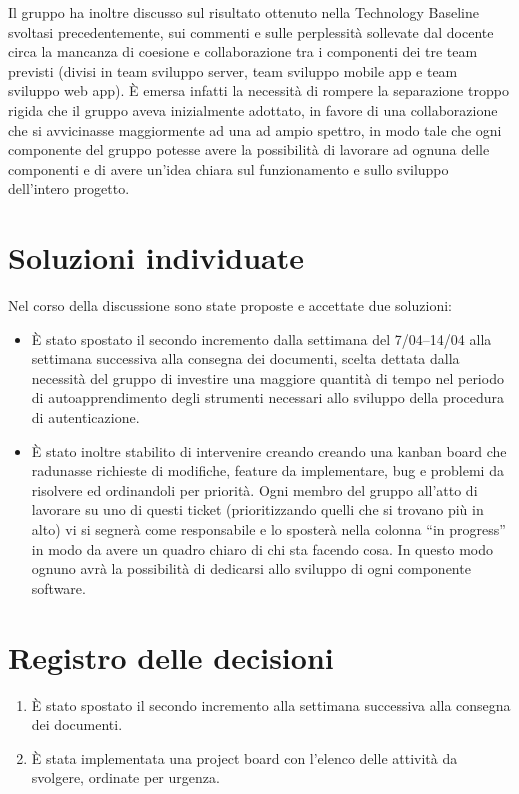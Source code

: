 \documentclass{article}
\begin{document}
Il gruppo ha inoltre discusso sul risultato ottenuto nella Technology Baseline svoltasi precedentemente, sui commenti e sulle perplessità sollevate dal docente circa la mancanza di coesione e collaborazione tra i componenti dei tre team previsti (divisi in team sviluppo server, team sviluppo mobile app e team sviluppo web app).
È emersa infatti la necessità di rompere la separazione troppo rigida che il gruppo aveva inizialmente adottato, in favore di una collaborazione che si avvicinasse maggiormente ad una ad ampio spettro, in modo tale che ogni componente del gruppo potesse avere la possibilità di lavorare ad ognuna delle componenti e di avere un'idea chiara sul funzionamento e sullo sviluppo dell'intero progetto.

\section{Soluzioni individuate}%
\label{sec:soluzioni_individuate}

Nel corso della discussione sono state proposte e accettate due soluzioni:
\begin{itemize}
  \item È stato spostato il secondo incremento dalla settimana del 7/04--14/04 alla settimana successiva alla consegna dei documenti, scelta dettata dalla necessità del gruppo di investire una maggiore quantità di tempo nel periodo di autoapprendimento degli strumenti necessari allo sviluppo della procedura di autenticazione.
  \item È stato inoltre stabilito di intervenire creando creando una kanban board che radunasse richieste di modifiche, feature da implementare, bug e problemi da risolvere ed ordinandoli per priorità. Ogni membro del gruppo all'atto di lavorare su uno di questi ticket (prioritizzando quelli che si trovano più in alto) vi si segnerà come responsabile e lo sposterà nella colonna ``in progress'' in modo da avere un quadro chiaro di chi sta facendo cosa. In questo modo ognuno avrà la possibilità di dedicarsi allo sviluppo di ogni componente software.
\end{itemize}

\newpage
\section{Registro delle decisioni}%
\label{sec:registro_delle_decisioni}

\begin{enumerate}
  \item È stato spostato il secondo incremento alla settimana successiva alla consegna dei documenti.
  \item È stata implementata una project board con l'elenco delle attività da svolgere, ordinate per urgenza.
\end{enumerate}

\end{document}
